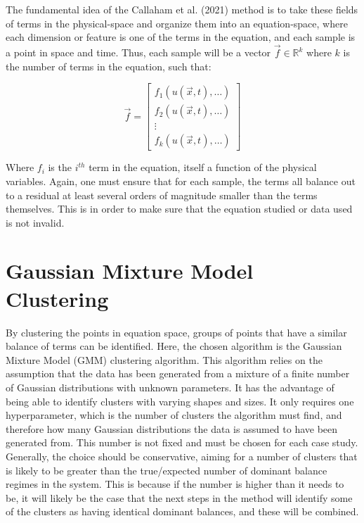 \documentclass[12pt]{report} %
\begin{document}
The fundamental idea of the Callaham et al. (2021) method is to take these fields of terms in the physical-space and organize them into an equation-space, where each dimension or feature is one of the terms in the equation, and each sample is a point in space and time. Thus, each sample will be a vector $\vec{f} \in \mathbb{R}^k$ where $k$ is the number of terms in the equation, such that:

\begin{equation}
    \vec{f} = \begin{bmatrix} f_1(u(\vec{x}, t), \hdots) \\ f_2(u(\vec{x}, t), \hdots) \\ \vdots \\ f_k(u(\vec{x}, t), \hdots) \end{bmatrix}
\end{equation}

Where $f_i$ is the $i^{th}$ term in the equation, itself a function of the physical variables. Again, one must ensure that for each sample, the terms all balance out to a residual at least several orders of magnitude smaller than the terms themselves. This is in order to make sure that the equation studied or data used is not invalid.


\section{Gaussian Mixture Model Clustering}

By clustering the points in equation space, groups of points that have a similar balance of terms can be identified. Here, the chosen algorithm is the Gaussian Mixture Model (GMM) clustering algorithm. This algorithm relies on the assumption that the data has been generated from a mixture of a finite number of Gaussian distributions with unknown parameters\cite{mit2015algorithmic}. It has the advantage of being able to identify clusters with varying shapes and sizes. It only requires one hyperparameter, which is the number of clusters the algorithm must find, and therefore how many Gaussian distributions the data is assumed to have been generated from\cite{sklearnGMM}. This number is not fixed and must be chosen for each case study. Generally, the choice should be conservative, aiming for a number of clusters that is likely to be greater than the true/expected number of dominant balance regimes in the system. This is because if the number is higher than it needs to be, it will likely be the case that the next steps in the method will identify some of the clusters as having identical dominant balances, and these will be combined.
\end{document}
